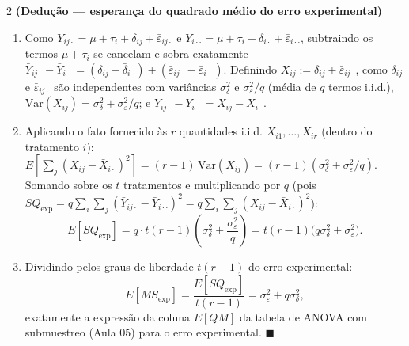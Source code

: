 \documentclass[11pt]{article}
\begin{document}
\begin{questao}{2} \textbf{(Dedução --- esperança do quadrado médio do erro experimental)}
\end{questao}
\begin{solucao}
\begin{enumerate}[label=(\alph*)]
  \item Como $\bar Y_{ij\cdot} = \mu+\tau_i+\delta_{ij}+\bar\varepsilon_{ij\cdot}$ e $\bar
    Y_{i\cdot\cdot} = \mu+\tau_i+\bar\delta_{i\cdot}+\bar\varepsilon_{i\cdot\cdot}$, subtraindo os
    termos $\mu+\tau_i$ se cancelam e sobra exatamente $\bar Y_{ij\cdot}-\bar Y_{i\cdot\cdot} =
    (\delta_{ij}-\bar\delta_{i\cdot}) + (\bar\varepsilon_{ij\cdot}-\bar\varepsilon_{i\cdot\cdot})$.
    Definindo $X_{ij} := \delta_{ij}+\bar\varepsilon_{ij\cdot}$, como $\delta_{ij}$ e
    $\bar\varepsilon_{ij\cdot}$ são independentes com variâncias $\sigma_\delta^2$ e
    $\sigma_\varepsilon^2/q$ (média de $q$ termos i.i.d.), $\mathrm{Var}(X_{ij}) = \sigma_\delta^2
    + \sigma_\varepsilon^2/q$; e $\bar Y_{ij\cdot}-\bar Y_{i\cdot\cdot} = X_{ij}-\bar X_{i\cdot}$.
  \item Aplicando o fato fornecido às $r$ quantidades i.i.d. $X_{i1},\ldots,X_{ir}$ (dentro do
    tratamento $i$): $E\!\left[\sum_j (X_{ij}-\bar X_{i\cdot})^2\right] = (r-1)\,\mathrm{Var}(X_{ij})
    = (r-1)(\sigma_\delta^2+\sigma_\varepsilon^2/q)$. Somando sobre os $t$ tratamentos e
    multiplicando por $q$ (pois $SQ_{\text{exp}} = q\sum_i\sum_j(\bar Y_{ij\cdot}-\bar
    Y_{i\cdot\cdot})^2 = q\sum_i\sum_j(X_{ij}-\bar X_{i\cdot})^2$):
    $$
    E[SQ_{\text{exp}}] = q\cdot t(r-1)\left(\sigma_\delta^2+\frac{\sigma_\varepsilon^2}{q}\right)
    = t(r-1)\big(q\sigma_\delta^2+\sigma_\varepsilon^2\big).
    $$
  \item Dividindo pelos graus de liberdade $t(r-1)$ do erro experimental:
    $$
    E[MS_{\text{exp}}] = \frac{E[SQ_{\text{exp}}]}{t(r-1)} = \sigma_\varepsilon^2 +
    q\sigma_\delta^2,
    $$
    exatamente a expressão da coluna $E[QM]$ da tabela de ANOVA com submuestreo (Aula 05) para o
    erro experimental. $\blacksquare$
\end{enumerate}
\end{solucao}
\end{document}

